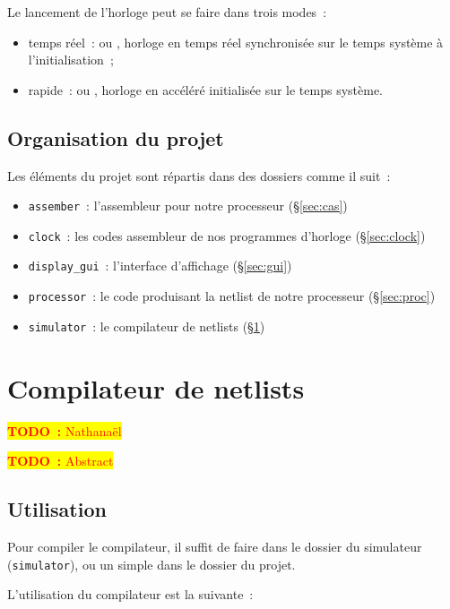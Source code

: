 \documentclass[11pt,a4paper]{article}
\newcommand{\htodo}[1]{\begin{huge}\colorbox{yellow}{\textcolor{red}{\textbf{TODO~:} #1}}\end{huge}}
\newcommand{\todo}[1]{\colorbox{yellow}{\textcolor{red}{\textbf{TODO~:} #1}}}
\begin{document}
Le lancement de l'horloge peut se faire dans trois modes~:
\begin{itemize}
\item temps réel~:  ou , horloge en temps réel synchronisée sur le temps système à l'initialisation~;
\item rapide~:  ou , horloge en accéléré initialisée sur le temps système.
\end{itemize}

\subsection{Organisation du projet}

Les éléments du projet sont répartis dans des dossiers comme il suit~:
\begin{itemize}
\item \texttt{assember}~: l'assembleur pour notre processeur (§\ref{sec:cas})
\item \texttt{clock}~: les codes assembleur de nos programmes d'horloge (§\ref{sec:clock})
\item \texttt{display\_gui}~: l'interface d'affichage (§\ref{sec:gui})
\item \texttt{processor}~: le code produisant la netlist de notre processeur (§\ref{sec:proc})
\item \texttt{simulator}~: le compilateur de netlists (§\ref{sec:compilo})
\end{itemize}

\section{Compilateur de netlists} \label{sec:compilo}

\htodo{Nathanaël}

\todo{Abstract}

\subsection{Utilisation}

Pour compiler le compilateur, il suffit de faire
 dans le dossier du simulateur
(\verb!simulator!), ou un simple  dans le dossier du
projet.

L'utilisation du compilateur est la suivante~:
\end{document}
